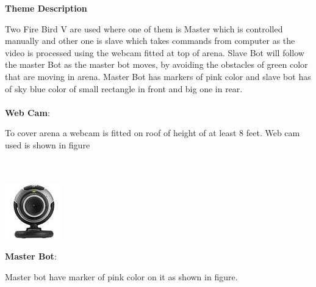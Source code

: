 \documentclass[report]{res}
\begin{document}
	\pagebreak
	
	
	\begin{center}
		\textbf{\huge Theme Description} \\
	\end{center}
	
	Two Fire Bird V are used where one of them is Master which is controlled manually and other one is slave which takes commands from computer as the video is processed using the webcam fitted at top of arena. Slave Bot will follow the master Bot as the master bot moves, by avoiding the obstacles of green color that are moving in arena. Master Bot has markers of pink color and slave bot has of sky blue color of small rectangle in front and big one in rear.\\ \\
	
	\textbf{\large Web Cam}:
	
	To cover arena a webcam is fitted on roof of height of at least 8 feet. Web cam used is shown in figure \\ \\ \\ 
	
	\begin{center}	
		\includegraphics[scale = 2]{graphics/cam.jpg}\\
	\end{center}
	
	\pagebreak
	\textbf{\large Master Bot}: 
	
	Master bot have marker of pink color on it as shown in figure.\\ \\
	
\end{document}

